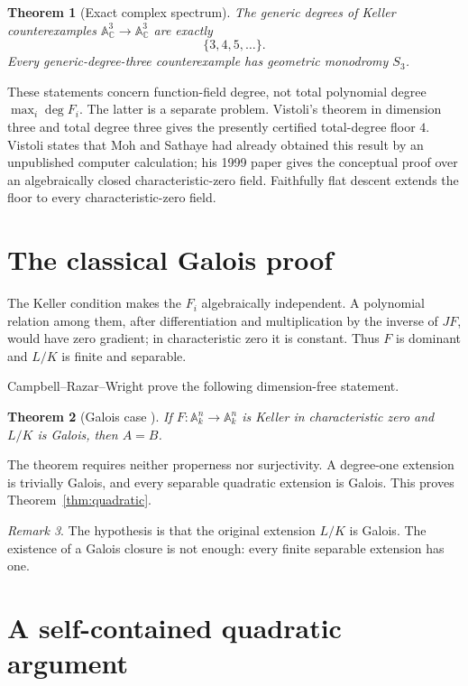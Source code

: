 \documentclass[11pt]{article}
\newtheorem{theorem}{Theorem}
\theoremstyle{remark}
\newtheorem{remark}[theorem]{Remark}
\newcommand{\A}{\mathbb A}
\newcommand{\C}{\mathbb C}
\begin{document}
\begin{theorem}[Exact complex spectrum]\label{thm:spectrum}
The generic degrees of Keller counterexamples
$\A^3_\C\to\A^3_\C$ are exactly
\[
 \{3,4,5,\ldots\}.
\]
Every generic-degree-three counterexample has geometric monodromy $S_3$.
\end{theorem}

These statements concern function-field degree, not total polynomial degree
$\max_i\deg F_i$.  The latter is a separate problem.  Vistoli's theorem in
dimension three and total degree three gives the presently certified
total-degree floor $4$. Vistoli states that Moh and Sathaye had already
obtained this result by an unpublished computer calculation; his 1999 paper
gives the conceptual proof over an algebraically closed characteristic-zero
field. Faithfully flat descent extends the floor to every
characteristic-zero field.

\section{The classical Galois proof}

The Keller condition makes the $F_i$ algebraically independent.  A
polynomial relation among them, after differentiation and multiplication by
the inverse of $JF$, would have zero gradient; in characteristic zero it is
constant.  Thus $F$ is dominant and $L/K$ is finite and separable.

Campbell--Razar--Wright prove the following dimension-free statement.

\begin{theorem}[Galois case {\cite{Campbell,Razar,Wright}}]\label{thm:galois}
If $F:\A^n_k\to\A^n_k$ is Keller in characteristic zero and $L/K$ is
Galois, then $A=B$.
\end{theorem}

The theorem requires neither properness nor surjectivity.  A degree-one
extension is trivially Galois, and every separable quadratic extension is
Galois.  This proves Theorem~\ref{thm:quadratic}.

\begin{remark}
The hypothesis is that the original extension $L/K$ is Galois.  The existence
of a Galois closure is not enough: every finite separable extension has one.
\end{remark}

\section{A self-contained quadratic argument}
\end{document}
